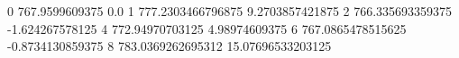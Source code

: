 0 767.9599609375 0.0
1 777.2303466796875 9.2703857421875
2 766.335693359375 -1.624267578125
4 772.94970703125 4.98974609375
6 767.0865478515625 -0.8734130859375
8 783.0369262695312 15.07696533203125
